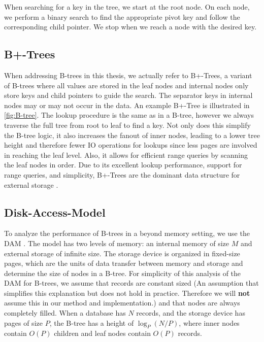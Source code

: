 When searching for a key in the tree, we start at the root node.
On each node, we perform a binary search to find the appropriate pivot key and follow the corresponding child pointer.
We stop when we reach a node with the desired key.

\subsection*{B+-Trees}
When addressing B-trees in this thesis, we actually refer to B+-Trees, a variant of B-trees where all values are stored in the leaf nodes and internal nodes only store keys and child pointers to guide the search.
The separator keys in internal nodes may or may not occur in the data. An example B+-Tree is illustrated in \autoref{fig:B-tree}.
The lookup procedure is the same as in a B-tree, however we always traverse the full tree from root to leaf to find a key.
Not only does this simplify the B-tree logic, it also increases the fanout of inner nodes, leading to a lower tree height and therefore fewer \ac{IO} operations for lookups since less pages are involved in reaching the leaf level.
Also, it allows for efficient range queries by scanning the leaf nodes in order.
Due to its excellent lookup performance, support for range queries, and simplicity, B+-Trees are the dominant data structure for external storage \cite{mdbs2024slides}.

\subsection*{Disk-Access-Model}
To analyze the performance of B-trees in a beyond memory setting, we use the \ac{DAM} \cite{aggarwal1988complexity} \cite{kuszmaul2014fractal}.
The model has two levels of memory: an internal memory of size $M$ and external storage of infinite size.
The storage device is organized in fixed-size pages, which are the units of data transfer between memory and storage and determine the size of nodes in a B-tree.
For simplicity of this analysis of the \ac{DAM} for B-trees, we assume that records are constant sized (An assumption that simplifies this explanation but does not hold in practice. 
Therefore we will \textbf{not} assume this in our method and implementation.) and that nodes are always completely filled.
When a database has $N$ records, and the storage device has pages of size $P$, the B-tree has a height of $\log_P(N/P)$, where inner nodes contain $O(P)$ children and leaf nodes contain $O(P)$ records.

